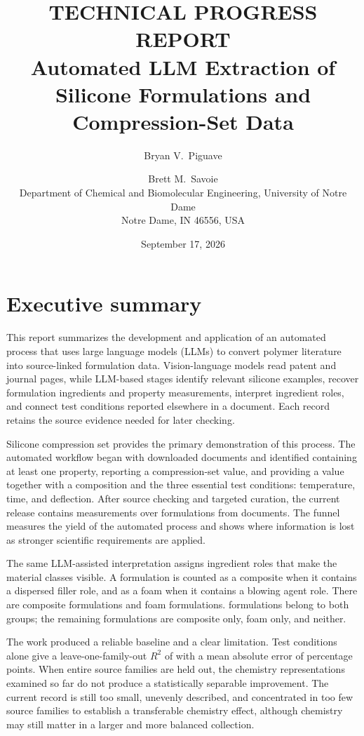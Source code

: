 \documentclass[10pt]{article}
\title{\vspace{-1.5em}
  {\large TECHNICAL PROGRESS REPORT}\\[0.6em]
  {\LARGE\bfseries Automated LLM Extraction of Silicone Formulations and Compression-Set Data}\\[0.4em]}
\author{Bryan V.\ Piguave \and Brett M.\ Savoie\\[0.4em]
  \normalsize Department of Chemical and Biomolecular Engineering, University of Notre Dame\\
  \normalsize Notre Dame, IN 46556, USA\\[0.6em]}
\date{September 17, 2026}
\begin{document}
\maketitle

\section*{Executive summary}
This report summarizes the development and application of an automated process
that uses large language models (LLMs) to convert polymer literature into
source-linked formulation data. Vision-language models read patent and journal
pages, while LLM-based stages identify relevant silicone examples, recover
formulation ingredients and property measurements, interpret ingredient roles,
and connect test conditions reported elsewhere in a document. Each record
retains the source evidence needed for later checking.

Silicone compression set provides the primary demonstration of this process.
The automated workflow began with \nCorpusDocs{} downloaded documents and
identified \nPropDocs{} containing at least one property, \nCsDocs{} reporting
a compression-set value, and \nCsCondDocs{} providing a value together with a
composition and the three essential test conditions: temperature, time, and
deflection. After source checking and targeted curation, the current release
contains \nRelRows{} measurements over \nRelForms{} formulations from
\nRelDocs{} documents. The funnel measures the yield of the automated process
and shows where information is lost as stronger scientific requirements are
applied.

The same LLM-assisted interpretation assigns ingredient roles that make the
material classes visible. A formulation is counted as a composite when it
contains a dispersed filler role, and as a foam when it contains a blowing
agent role. There are \nCompositeForms{} composite formulations and
\nFoamForms{} foam formulations. \nCompositeFoamForms{} formulations belong to
both groups; the remaining formulations are \nCompositeOnlyForms{} composite
only, \nFoamOnlyForms{} foam only, and \nNeitherForms{} neither.

The work produced a reliable baseline and a clear limitation. Test conditions
alone give a leave-one-family-out $R^2$ of \nLofoConditions{} with a mean
absolute error of \nLofoMaeConditions{} percentage points. When entire source
families are held out, the chemistry representations examined so far do not
produce a statistically separable improvement. The current record is still
too small, unevenly described, and concentrated in too few source families to
establish a transferable chemistry effect, although chemistry may still matter
in a larger and more balanced collection.
\end{document}
